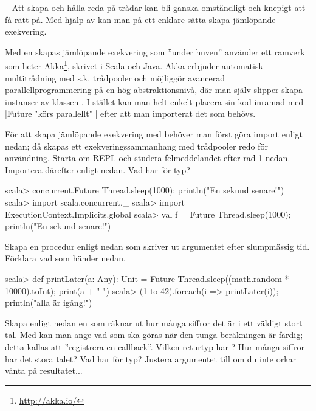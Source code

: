 
\QUESTBEGIN

\Task \label{task:future} \what~   Att skapa och hålla reda på trådar kan bli ganska omständligt och knepigt att få rätt på.
Med hjälp av  kan man på ett enklare sätta skapa jämlöpande exekvering.

\begin{Background}
Med en  skapas jämlöpande exekvering som ''under huven'' använder ett ramverk som heter Akka\footnote{\url{http://akka.io/}}, skrivet i Scala och Java. Akka erbjuder automatisk  multitrådning med s.k. trådpooler och möjliggör avancerad parallellprogrammering på en hög  abstraktionsnivå, där man själv slipper skapa instanser av klassen . I stället kan man helt enkelt placera sin kod inramad med \code|Future{ "körs parallellt" }| efter att man importerat det som behövs.
\end{Background}

\Subtask För att skapa jämlöpande exekvering med  behöver man först göra import enligt nedan; då skapas ett exekveringssammanhang med trådpooler redo för användning. Starta om REPL och studera felmeddelandet efter rad 1 nedan. Importera därefter enligt nedan. Vad har  för typ?
\begin{REPL}
scala> concurrent.Future { Thread.sleep(1000); println("En sekund senare!") }
scala> import scala.concurrent._
scala> import ExecutionContext.Implicits.global
scala> val f = Future { Thread.sleep(1000); println("En sekund senare!") }
\end{REPL}

\Subtask Skapa en procedur  enligt nedan som skriver ut argumentet efter slumpmässig tid. Förklara vad som händer nedan.
\begin{REPL}
scala> def printLater(a: Any): Unit =
         Future { Thread.sleep((math.random * 10000).toInt); print(a + " ") }
scala> (1 to 42).foreach(i => printLater(i)); println("alla är igång!")
\end{REPL}

\Subtask Skapa enligt nedan en  som räknar ut hur många siffror det är i ett väldigt stort tal. Med  kan man ange vad som ska göras när den tunga beräkningen är färdig; detta kallas att ''registrera en callback''. Vilken returtyp har ? Hur många siffror har det stora talet? Vad har  för typ? Justera argumentet till  om du inte orkar vänta på resultatet...

